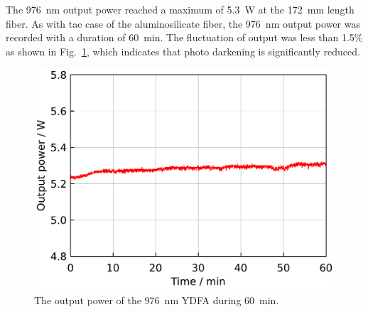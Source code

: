 \documentclass{osa-article}
\begin{document}
The \SI{976}{nm} output power reached a maximum of \SI{5.3}{\W} at the \SI{172}{\mm} length fiber.
As with tae case of the aluminosilicate fiber, the \SI{976}{\nm} output power was recorded with a duration of \SI{60}{\minute}.
The fluctuation of output was less than 1.5\% as shown in Fig.~\ref{fig:LongTermStabilityOfCORACTIVE976YDFA}, which indicates that photo darkening is significantly reduced.
\begin{figure}[h!]
  \centering
  \begin{minipage}[b]{0.5\linewidth}
    \centering
    \includegraphics[keepaspectratio, width=0.9\linewidth]{./Figure/DCF-YB-20-128P-FAC172mm_SignalLongTermStability_915Pump70W976Seed0.24W_Exp.pdf}
  \end{minipage}
  \caption{The output power of the \SI{976}{\nm} YDFA during \SI{60}{\minute}.}
  \label{fig:LongTermStabilityOfCORACTIVE976YDFA}
\end{figure}
\end{document}
